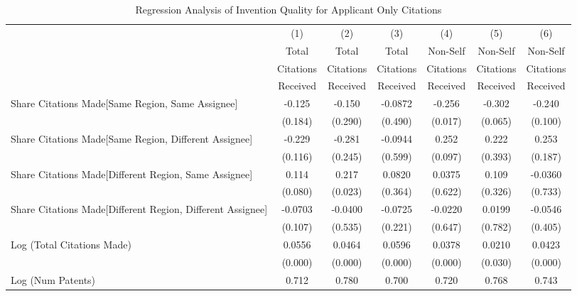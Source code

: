 \documentclass[12pt,letterpaper]{article}
\begin{document}
\begin{table}[htbp]\centering \caption{Regression Analysis of Invention Quality for Applicant Only Citations  \label{a.model123192021}}
\scriptsize
\singlespacing
\begin{tabular}{l*{6}{c}} \hline
                &\multicolumn{1}{c}{(1)}&\multicolumn{1}{c}{(2)}&\multicolumn{1}{c}{(3)}&\multicolumn{1}{c}{(4)}&\multicolumn{1}{c}{(5)}&\multicolumn{1}{c}{(6)}\\
                &\multicolumn{1}{c}{Total}&\multicolumn{1}{c}{Total}&\multicolumn{1}{c}{Total}&\multicolumn{1}{c}{Non-Self}&\multicolumn{1}{c}{Non-Self}&\multicolumn{1}{c}{Non-Self}\\
                &\multicolumn{1}{c}{Citations}&\multicolumn{1}{c}{Citations}&\multicolumn{1}{c}{Citations}&\multicolumn{1}{c}{Citations}&\multicolumn{1}{c}{Citations}&\multicolumn{1}{c}{Citations}\\
                 &\multicolumn{1}{c}{Received}&\multicolumn{1}{c}{Received}&\multicolumn{1}{c}{Received}&\multicolumn{1}{c}{Received}&\multicolumn{1}{c}{Received}&\multicolumn{1}{c}{Received}\\
\hline
Share Citations Made[Same Region, Same Assignee]&   -0.125&   -0.150&  -0.0872&   -0.256&   -0.302&   -0.240\\
                &  (0.184)&  (0.290)&  (0.490)&  (0.017)&  (0.065)&  (0.100)\\
Share Citations Made[Same Region, Different Assignee]&   -0.229&   -0.281&  -0.0944&    0.252&    0.222&    0.253\\
                &  (0.116)&  (0.245)&  (0.599)&  (0.097)&  (0.393)&  (0.187)\\
Share Citations Made[Different Region, Same Assignee]&    0.114&    0.217&   0.0820&   0.0375&    0.109&  -0.0360\\
                &  (0.080)&  (0.023)&  (0.364)&  (0.622)&  (0.326)&  (0.733)\\
Share Citations Made[Different Region, Different Assignee]&  -0.0703&  -0.0400&  -0.0725&  -0.0220&   0.0199&  -0.0546\\
                &  (0.107)&  (0.535)&  (0.221)&  (0.647)&  (0.782)&  (0.405)\\
Log (Total Citations Made)&   0.0556&   0.0464&   0.0596&   0.0378&   0.0210&   0.0423\\
                &  (0.000)&  (0.000)&  (0.000)&  (0.000)&  (0.030)&  (0.000)\\
Log (Num Patents)&    0.712&    0.780&    0.700&    0.720&    0.768&    0.743\\

\end{tabular}
\end{table}
\end{document}

